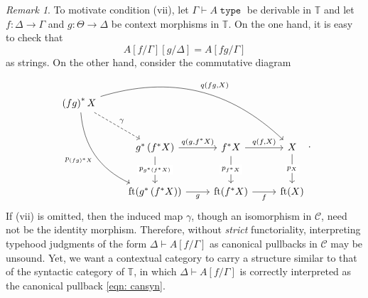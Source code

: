 \documentclass[10pt,letterpaper,cm]{nupset}
\theoremstyle{definition}
\theoremstyle{theorem}
\theoremstyle{remark}
\newtheorem{remark}[definition]{Remark}
\DeclareMathOperator{\ft}{ft}
\newcommand{\0}{\mathbf{0}}
\newcommand{\1}{\mathbf{1}}
\newcommand{\2}{\mathbf{2}}
\DeclareMathOperator{\type}{\mathtt{type}}
\renewcommand{\c}{\mathscr{C}}
\newcommand{\T}{\mathbb T}
\begin{document}
\begin{remark}
To motivate condition (vii), let $\Gamma \vdash A \type$ be derivable in $\T$ and let $f: \Delta \to \Gamma$ and $g: \Theta \to \Delta$ be context morphisms in $\T$. On the one hand, it is easy to check that \[
A\left[f/\Gamma\right]\left[g/\Delta\right] = A\left[fg/\Gamma\right] 
\] as strings. On the other hand, consider the commutative diagram
\[
\begin{tikzcd}[row sep=large]
\left(fg\right)^{\ast}{X} \arrow[rd, "\gamma", dashed] \arrow[rdd, "p_{\left(fg\right)^{\ast}{X}}"', bend right] \arrow[rrrd, "{q(fg, X)}", bend left] &                                                                                                                                 &                                                                            &                                \\
                                                                                                                                                       & g^{\ast}\left(f^{\ast}{X}\right) \arrow[d, "p_{g^{\ast}\left(f^{\ast}{X}\right)}" description] \arrow[r, "{q(g, f^{\ast}{X})}"] & f^{\ast}{X} \arrow[d, "p_{f^{\ast}{X}}" description] \arrow[r, "{q(f,X)}"] & X \arrow[d, "p_X" description] \\
                                                                                                                                                       & \ft(g^{\ast}\left(f^{\ast}{X}\right)) \arrow[r, "g"']                                                                           & \ft(f^{\ast}{X}) \arrow[r, "f"']                                           & \ft(X)                        
\end{tikzcd}
.\] If (vii) is omitted, then the induced map $\gamma$, though an isomorphism in $\c$, need not be the identity morphism.  Therefore, without \emph{strict} functoriality, interpreting typehood judgments of the form $\Delta \vdash A\left[f/\Gamma\right]$ as canonical pullbacks in $\c$ may be unsound. Yet, we want a contextual category to carry a structure similar to that of the syntactic category of $\T$, in which $\Delta \vdash A\left[f/\Gamma\right]$ is correctly interpreted as the canonical pullback \eqref{eqn: cansyn}.    
\end{remark}
\end{document}
